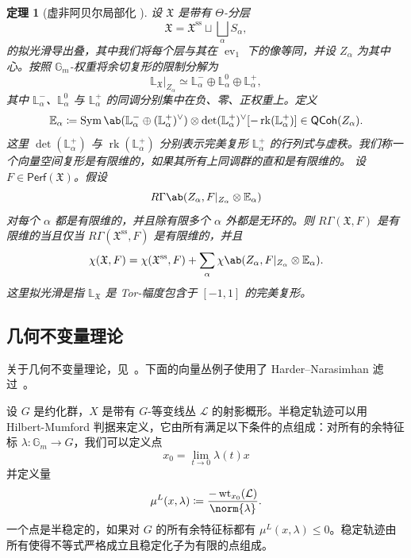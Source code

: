 \documentclass{amsart}
\newtheorem{thm}{定理}[section]
\theoremstyle{definition}
\theoremstyle{remark}
\theoremstyle{plain}
\theoremstyle{definition}
\theoremstyle{remark}
\newcommand{\G}{\mathbb{G}}
\newcommand{\E}{\mathbb{E}}
\renewcommand{\L}{\mathbb{L}}
\newcommand{\mc}[1]{\mathcal{#1}}
\newcommand{\mf}[1]{\mathfrak{#1}}
\newcommand{\mr}[1]{\mathrm{#1}}
\newcommand{\on}[1]{\operatorname{#1}}
\newcommand{\ms}[1]{\mathsf{#1}}
\newcommand{\1}{\mathbf{1}}
\newcommand{\2}{\mathbf{2}}
\newcommand{\3}{\mathbf{3}}
\DeclareMathOperator{\ev}{ev}
\begin{document}
\begin{thm}[虚非阿贝尔局部化 {\cite[Theorem~5.1]{HLlocalization}}]
    设 \(\mf{X}\) 是带有 \(\Theta\)-分层
    \[
        \mf{X}
        =
        \mf{X}^{\mr{ss}}
        \sqcup
        \bigsqcup_\alpha S_\alpha,
    \]
    的拟光滑导出叠，其中我们将每个层与其在 \(\ev_1\) 下的像等同，并设 \(Z_\alpha\) 为其中心。按照 \(\G_m\)-权重将余切复形的限制分解为
    \[
        \L_{\mf{X}}|_{Z_\alpha}
        \simeq
        \L_\alpha^-
        \oplus
        \L_\alpha^0
        \oplus
        \L_\alpha^+,
    \]
    其中 \(\L_\alpha^-\)、\(\L_\alpha^0\) 与 \(\L_\alpha^+\) 的同调分别集中在负、零、正权重上。定义
    \[
        \E_\alpha
        \coloneqq
        \on{Sym}\ab(
            \L_\alpha^-
            \oplus
            (\L_\alpha^+)^\vee
        )
        \otimes
        \det(\L_\alpha^+)^\vee
        [-\on{rk}(\L_\alpha^+)]
        \in
        \ms{QCoh}(Z_\alpha).
    \]
    这里 \(\det(\L_\alpha^+)\) 与 \(\on{rk}(\L_\alpha^+)\) 分别表示完美复形 \(\L_\alpha^+\) 的行列式与虚秩。我们称一个向量空间复形是有限维的，如果其所有上同调群的直和是有限维的。
    设 \(F\in\ms{Perf}(\mf{X})\)。假设
    \[
        R\Gamma\ab(
            Z_\alpha,
            F|_{Z_\alpha}\otimes\E_\alpha
        )
    \]
    对每个 \(\alpha\) 都是有限维的，并且除有限多个 \(\alpha\) 外都是无环的。则 \(R\Gamma(\mf{X},F)\) 是有限维的当且仅当 \(R\Gamma(\mf{X}^{\mr{ss}},F)\) 是有限维的，并且
    \[
        \chi(\mf{X},F)
        =
        \chi(\mf{X}^{\mr{ss}},F)
        +
        \sum_\alpha
        \chi\ab(
            Z_\alpha,
            F|_{Z_\alpha}\otimes\E_\alpha
        ).
    \]
    这里拟光滑是指 \(\L_{\mf{X}}\) 是 Tor-幅度包含于 \([-1,1]\) 的完美复形。
\end{thm}


\subsection{几何不变量理论}%
\label{sub:Geometric invariant theory}

关于几何不变量理论，见~\cite{MFK1994}。下面的向量丛例子使用了 Harder--Narasimhan 滤过~\cite{HN1975}。

设 \(G\) 是约化群，\(X\) 是带有 \(G\)-等变线丛 \(\mc{L}\) 的射影概形。半稳定轨迹可以用 Hilbert-Mumford 判据来定义，它由所有满足以下条件的点组成：对所有的余特征标
\(\lambda \colon \G_m \to G\)，我们可以定义点
\[ x_0 = \lim_{t \to 0} \lambda(t) x \]
并定义量
\[ \mu^L(x, \lambda) \coloneqq \frac{-\on{wt}_{x_0}(\mc{L})}{\norm{\lambda}}. \]
一个点是半稳定的，如果对 \(G\) 的所有余特征标都有 \(\mu^L(x, \lambda) \leq 0\)。稳定轨迹由所有使得不等式严格成立且稳定化子为有限的点组成。
\end{document}
